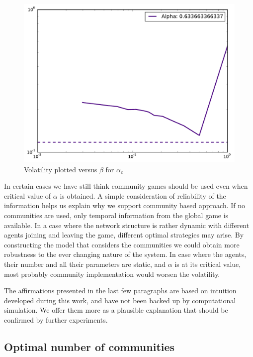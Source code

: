 \begin{figure}[h]
\centering
\includegraphics[scale=0.4]{images/algorithm/patch-063.pdf}
\caption{Volatility plotted versus $\beta$ for $\alpha_c$}
\label{fig:beta alpha critical}
\end{figure}

In certain cases we have still think community games should be used even when critical value of $\alpha$ is obtained.
A simple consideration of reliability of the information helps us explain why we support community based approach.
If no communities are used, only temporal information from the global game is available.
In a case where the network structure is rather dynamic with different agents joining and leaving the game, different optimal strategies may arise.
By constructing the model that considers the communities we could obtain more robustness to the ever changing nature of the system.
In case where the agents, their number and all their parameters are static, and $\alpha$ is at its critical value, most probably community implementation would worsen the volatility.

The affirmations presented in the last few paragraphs are based on intuition developed during this work, and have not been backed up by computational simulation.
We offer them more as a plausible explanation that should be confirmed by further experiments.

\subsection{Optimal number of communities}
\label{subsec:optimal beta}

